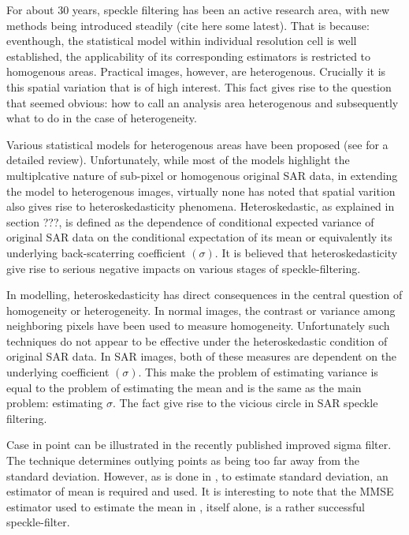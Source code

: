 \documentclass[journal]{IEEEtran}
\begin{document}
For about 30 years, speckle filtering has been an active research area, with new methods being introduced steadily (cite here some latest). That is because: eventhough, the statistical model within individual resolution cell is well established, the applicability of its corresponding estimators is restricted to homogenous areas. Practical images, however, are heterogenous. Crucially it is this spatial variation that is of high interest. This fact gives rise to the question that seemed obvious: how to call an analysis area heterogenous and subsequently what to do in the case of heterogeneity.

Various statistical models for heterogenous areas have been proposed (see \cite{Touzi_2002_TGRS} for a detailed review). Unfortunately, while most of the models highlight the multiplcative nature of sub-pixel or homogenous original SAR data, in extending the model to heterogenous images, virtually none has noted that spatial varition also gives rise to heteroskedasticity phenomena. Heteroskedastic, as explained in section ???, is defined as the dependence of conditional expected variance of original SAR data on the conditional expectation of its mean or equivalently its underlying back-scaterring coefficient $(\sigma)$. It is believed that heteroskedasticity give rise to serious negative impacts on various stages of speckle-filtering. 

In modelling, heteroskedasticity has direct consequences in the central question of homogeneity or heterogeneity. In normal images, the contrast or variance among neighboring pixels have been used to measure homogeneity. Unfortunately such techniques do not appear to be effective under the heteroskedastic condition of original SAR data. In SAR images, both of these measures are dependent on the underlying coefficient $(\sigma)$. This make the problem of estimating variance is equal to the problem of estimating the mean and is the same as the main problem: estimating $\sigma$. The fact give rise to the vicious circle in SAR speckle filtering.

Case in point can be illustrated in the recently published improved sigma filter\cite{Lee_TGRS_2009}. The technique determines outlying points as being too far away from the standard deviation. However, as is done in \cite{Lee_TGRS_2009}, to estimate standard deviation, an estimator of mean is required and used. It is interesting to note that the MMSE estimator used to estimate the mean in \cite{Lee_TGRS_2009}, itself alone, is a rather successful speckle-filter\cite{Lee_PAMI_1980}.
\end{document}

